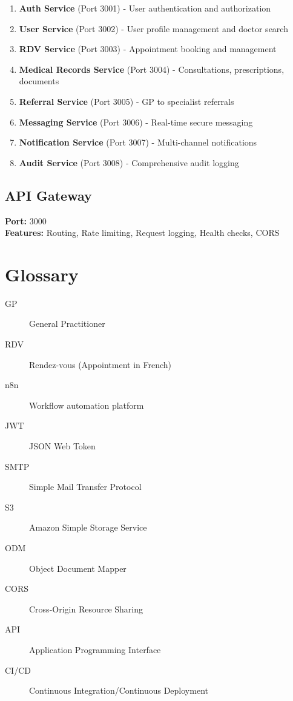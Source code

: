 \documentclass[11pt,a4paper]{article}
\begin{document}
\begin{enumerate}
    \item \textbf{Auth Service} (Port 3001) - User authentication and authorization
    \item \textbf{User Service} (Port 3002) - User profile management and doctor search
    \item \textbf{RDV Service} (Port 3003) - Appointment booking and management
    \item \textbf{Medical Records Service} (Port 3004) - Consultations, prescriptions, documents
    \item \textbf{Referral Service} (Port 3005) - GP to specialist referrals
    \item \textbf{Messaging Service} (Port 3006) - Real-time secure messaging
    \item \textbf{Notification Service} (Port 3007) - Multi-channel notifications
    \item \textbf{Audit Service} (Port 3008) - Comprehensive audit logging
\end{enumerate}

\subsection{API Gateway}

\textbf{Port:} 3000\\
\textbf{Features:} Routing, Rate limiting, Request logging, Health checks, CORS

\section{Glossary}

\begin{description}
    \item[GP] General Practitioner
    \item[RDV] Rendez-vous (Appointment in French)
    \item[n8n] Workflow automation platform
    \item[JWT] JSON Web Token
    \item[SMTP] Simple Mail Transfer Protocol
    \item[S3] Amazon Simple Storage Service
    \item[ODM] Object Document Mapper
    \item[CORS] Cross-Origin Resource Sharing
    \item[API] Application Programming Interface
    \item[CI/CD] Continuous Integration/Continuous Deployment
\end{description}
\end{document}

